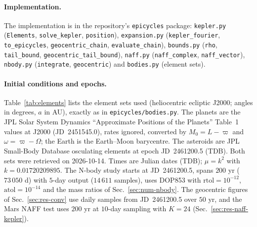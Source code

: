 \paragraph*{Implementation.}
The implementation is in the repository's \texttt{epicycles} package:
\texttt{kepler.py} (\texttt{Elements}, \texttt{solve\_kepler}, \texttt{position}),
\texttt{expansion.py} (\texttt{kepler\_fourier}, \texttt{to\_epicycles},
\texttt{geocentric\_chain}, \texttt{evaluate\_chain}), \texttt{bounds.py}
(\texttt{rho}, \texttt{tail\_bound}, \texttt{geocentric\_tail\_bound}),
\texttt{naff.py} (\texttt{naff\_complex}, \texttt{naff\_vector}),
\texttt{nbody.py} (\texttt{integrate}, \texttt{geocentric}) and
\texttt{bodies.py} (element sets).

\paragraph*{Initial conditions and epochs.}
Table~\ref{tab:elements} lists the element sets used (heliocentric ecliptic J2000;
angles in degrees, $a$ in AU), exactly as in \texttt{epicycles/bodies.py}. The
planets are the JPL Solar System Dynamics ``Approximate Positions of the Planets''
Table~1 values at J2000 (JD~2451545.0), rates ignored, converted by
$M_0=L-\varpi$ and $\omega=\varpi-\Omega$; the Earth is the Earth--Moon barycentre.
The asteroids are JPL Small-Body Database osculating elements at epoch JD~2461200.5
(TDB). Both sets were retrieved on 2026-10-14. Times are Julian dates (TDB);
$\mu=k^2$ with $k=0.01720209895$. The N-body study starts at JD~2461200.5, spans
$200$ yr ($73\,050$ d) with $5$-day output ($14\,611$ samples), uses DOP853 with
$\mathrm{rtol}=10^{-12}$, $\mathrm{atol}=10^{-14}$ and the mass ratios of
Sec.~\ref{sec:num-nbody}. The geocentric figures of Sec.~\ref{sec:res-conv} use
daily samples from JD~2461200.5 over $50$ yr, and the Mars NAFF test uses $200$ yr
at $10$-day sampling with $K=24$ (Sec.~\ref{sec:res-naff-kepler}).

